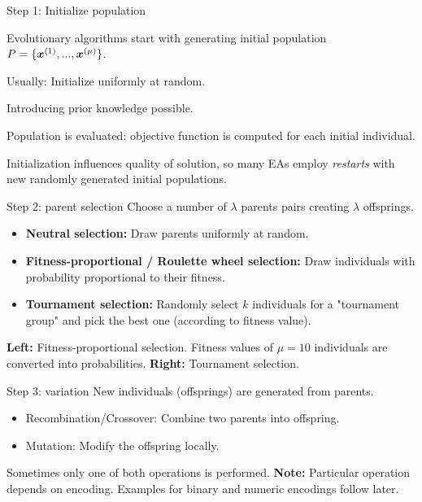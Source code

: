 \documentclass[11pt,compress,t,notes=noshow, xcolor=table]{beamer}
\begin{document}
\begin{framei}{Step 1: Initialize population}
\item Evolutionary algorithms start with generating initial population $P = \{\bm{x}^{(1)}, ..., \bm{x}^{(\mu)}\}$.
\item Usually: Initialize uniformly at random.
\item Introducing prior knowledge possible.
\item Population is evaluated: objective function is computed for each initial individual.
\item Initialization influences quality of solution, so many EAs employ \textit{restarts} with new randomly generated initial populations.
\end{framei}


\begin{framev}[fs=small]{Step 2: parent selection}
Choose a number of $\lambda$ parents pairs creating $\lambda$ offsprings.
\begin{itemize}
\item \textbf{Neutral selection:} Draw parents uniformly at random.
\item \textbf{Fitness-proportional / Roulette wheel selection:} Draw individuals with probability proportional to their fitness.
\item \textbf{Tournament selection:} Randomly select $k$ individuals for a "tournament group" and pick the best one (according to fitness value).
\end{itemize}
\vfill
{}
\begin{footnotesize}\begin{center}
\textbf{Left:} Fitness-proportional selection.
Fitness values of $\mu = 10$ individuals are converted into probabilities.
\textbf{Right:} Tournament selection.
\end{center}\end{footnotesize}
\end{framev}


\begin{framev}{Step 3: variation}
New individuals (offsprings) are generated from parents.
\begin{itemize}
\item Recombination/Crossover: Combine two parents into offspring.
\item Mutation: Modify the offspring locally.
\end{itemize}
Sometimes only one of both operations is performed.
\spacer
{}
\textbf{Note: } Particular operation depends on encoding.
Examples for binary and numeric encodings follow later.
\end{framev}
\end{document}
